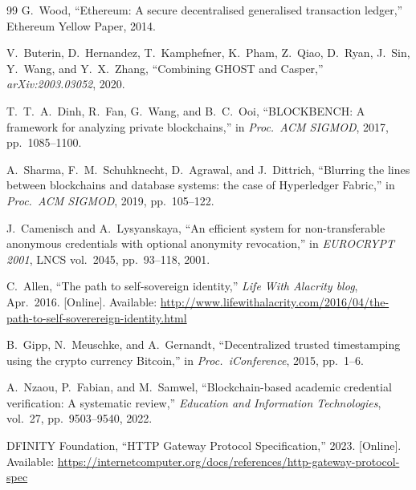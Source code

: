 \documentclass[conference]{IEEEtran}
\begin{document}
\begin{thebibliography}{99}
G.~Wood,
``Ethereum: A secure decentralised generalised transaction ledger,''
Ethereum Yellow Paper, 2014.

V.~Buterin, D.~Hernandez, T.~Kamphefner, K.~Pham, Z.~Qiao, D.~Ryan, J.~Sin, Y.~Wang, and Y.~X.~Zhang,
``Combining GHOST and Casper,''
\textit{arXiv:2003.03052}, 2020.

T.~T.~A.~Dinh, R.~Fan, G.~Wang, and B.~C.~Ooi,
``BLOCKBENCH: A framework for analyzing private blockchains,''
in \textit{Proc.\ ACM SIGMOD}, 2017, pp.~1085--1100.

A.~Sharma, F.~M.~Schuhknecht, D.~Agrawal, and J.~Dittrich,
``Blurring the lines between blockchains and database systems: the case of Hyperledger Fabric,''
in \textit{Proc.\ ACM SIGMOD}, 2019, pp.~105--122.

J.~Camenisch and A.~Lysyanskaya,
``An efficient system for non-transferable anonymous credentials with optional anonymity revocation,''
in \textit{EUROCRYPT 2001}, LNCS vol.~2045, pp.~93--118, 2001.

C.~Allen,
``The path to self-sovereign identity,''
\textit{Life With Alacrity blog}, Apr.~2016.
[Online]. Available: \url{http://www.lifewithalacrity.com/2016/04/the-path-to-self-soverereign-identity.html}

B.~Gipp, N.~Meuschke, and A.~Gernandt,
``Decentralized trusted timestamping using the crypto currency Bitcoin,''
in \textit{Proc.\ iConference}, 2015, pp.~1--6.

A.~Nzaou, P.~Fabian, and M.~Samwel,
``Blockchain-based academic credential verification: A systematic review,''
\textit{Education and Information Technologies}, vol.~27, pp.~9503--9540, 2022.

DFINITY Foundation,
``HTTP Gateway Protocol Specification,''
2023.
[Online]. Available: \url{https://internetcomputer.org/docs/references/http-gateway-protocol-spec}

\end{thebibliography}
\end{document}
